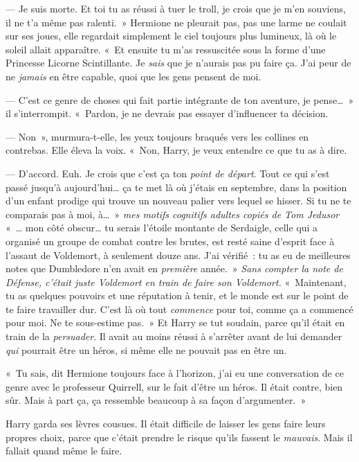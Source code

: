 --- Je suis morte. Et toi tu as réussi à tuer le troll, je crois que je m'en souviens, il ne t'a même pas ralenti.~» Hermione ne pleurait pas, pas une larme ne coulait sur ses joues, elle regardait simplement le ciel toujours plus lumineux, là où le soleil allait apparaître. «~Et ensuite tu m'as ressuscitée sous la forme d'une Princesse Licorne Scintillante. Je \emph{sais} que je n'aurais pas pu faire ça. J'ai peur de ne \emph{jamais} en être capable, quoi que les gens pensent de moi.

--- C'est ce genre de choses qui fait partie intégrante de ton aventure, je pense…~» il s'interrompit. «~Pardon, je ne devrais pas essayer d'influencer ta décision.

--- Non~», murmura-t-elle, les yeux toujours braqués vers les collines en contrebas. Elle éleva la voix. «~Non, Harry, je veux entendre ce que tu as à dire.

--- D'accord. Euh. Je crois que c'est ça ton \emph{point de départ}. Tout ce qui s'est passé jusqu'à aujourd'hui… ça te met là où j'étais en septembre, dans la position d'un enfant prodige qui trouve un nouveau palier vers lequel se hisser. Si tu ne te comparais pas à moi, à…~» \emph{mes motifs cognitifs adultes copiés de Tom Jedusor} «~… mon côté obscur… tu serais l'étoile montante de Serdaigle, celle qui a organisé un groupe de combat contre les brutes, est resté saine d'esprit face à l'assaut de Voldemort, à seulement douze ans. J'ai vérifié~: tu as eu de meilleures notes que Dumbledore n'en avait en \emph{première} année.~» \emph{Sans compter la note de Défense, c'était juste Voldemort en train de faire son Voldemort.} «~Maintenant, tu as quelques pouvoirs et une réputation à tenir, et le monde est sur le point de te faire travailler dur. C'est là où tout \emph{commence} pour toi, comme ça a commencé pour moi. Ne te sous-estime pas.~» Et Harry se tut soudain, parce qu'il était en train de la \emph{persuader}. Il avait au moins réussi à s'arrêter avant de lui demander \emph{qui} pourrait être un héros, si même elle ne pouvait pas en être un.

«~Tu sais, dit Hermione toujours face à l'horizon, j'ai eu une conversation de ce genre avec le professeur Quirrell, sur le fait d'être un héros. Il était contre, bien sûr. Mais à part ça, ça ressemble beaucoup à sa façon d'argumenter.~»

Harry garda ses lèvres cousues. Il était difficile de laisser les gens faire leurs propres choix, parce que c'était prendre le risque qu'ils fassent le \emph{mauvais}. Mais il fallait quand même le faire.

